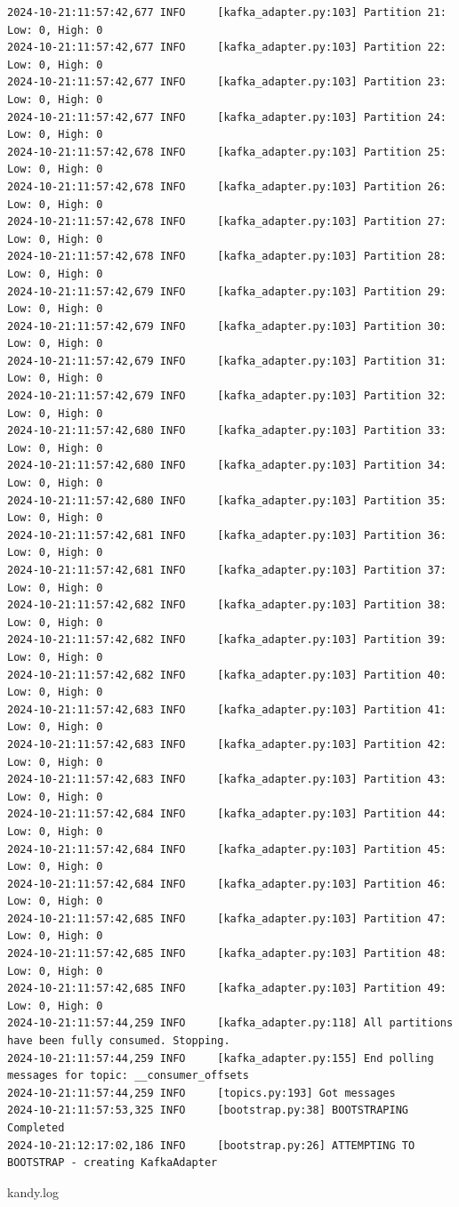 \documentclass[10pt , a4paper]{report}
\newenvironment{code}{\captionsetup{type=listing}}{}
\begin{document}
\begin{code}
\begin{verbatim}
2024-10-21:11:57:42,677 INFO     [kafka_adapter.py:103] Partition 21: Low: 0, High: 0
2024-10-21:11:57:42,677 INFO     [kafka_adapter.py:103] Partition 22: Low: 0, High: 0
2024-10-21:11:57:42,677 INFO     [kafka_adapter.py:103] Partition 23: Low: 0, High: 0
2024-10-21:11:57:42,677 INFO     [kafka_adapter.py:103] Partition 24: Low: 0, High: 0
2024-10-21:11:57:42,678 INFO     [kafka_adapter.py:103] Partition 25: Low: 0, High: 0
2024-10-21:11:57:42,678 INFO     [kafka_adapter.py:103] Partition 26: Low: 0, High: 0
2024-10-21:11:57:42,678 INFO     [kafka_adapter.py:103] Partition 27: Low: 0, High: 0
2024-10-21:11:57:42,678 INFO     [kafka_adapter.py:103] Partition 28: Low: 0, High: 0
2024-10-21:11:57:42,679 INFO     [kafka_adapter.py:103] Partition 29: Low: 0, High: 0
2024-10-21:11:57:42,679 INFO     [kafka_adapter.py:103] Partition 30: Low: 0, High: 0
2024-10-21:11:57:42,679 INFO     [kafka_adapter.py:103] Partition 31: Low: 0, High: 0
2024-10-21:11:57:42,679 INFO     [kafka_adapter.py:103] Partition 32: Low: 0, High: 0
2024-10-21:11:57:42,680 INFO     [kafka_adapter.py:103] Partition 33: Low: 0, High: 0
2024-10-21:11:57:42,680 INFO     [kafka_adapter.py:103] Partition 34: Low: 0, High: 0
2024-10-21:11:57:42,680 INFO     [kafka_adapter.py:103] Partition 35: Low: 0, High: 0
2024-10-21:11:57:42,681 INFO     [kafka_adapter.py:103] Partition 36: Low: 0, High: 0
2024-10-21:11:57:42,681 INFO     [kafka_adapter.py:103] Partition 37: Low: 0, High: 0
2024-10-21:11:57:42,682 INFO     [kafka_adapter.py:103] Partition 38: Low: 0, High: 0
2024-10-21:11:57:42,682 INFO     [kafka_adapter.py:103] Partition 39: Low: 0, High: 0
2024-10-21:11:57:42,682 INFO     [kafka_adapter.py:103] Partition 40: Low: 0, High: 0
2024-10-21:11:57:42,683 INFO     [kafka_adapter.py:103] Partition 41: Low: 0, High: 0
2024-10-21:11:57:42,683 INFO     [kafka_adapter.py:103] Partition 42: Low: 0, High: 0
2024-10-21:11:57:42,683 INFO     [kafka_adapter.py:103] Partition 43: Low: 0, High: 0
2024-10-21:11:57:42,684 INFO     [kafka_adapter.py:103] Partition 44: Low: 0, High: 0
2024-10-21:11:57:42,684 INFO     [kafka_adapter.py:103] Partition 45: Low: 0, High: 0
2024-10-21:11:57:42,684 INFO     [kafka_adapter.py:103] Partition 46: Low: 0, High: 0
2024-10-21:11:57:42,685 INFO     [kafka_adapter.py:103] Partition 47: Low: 0, High: 0
2024-10-21:11:57:42,685 INFO     [kafka_adapter.py:103] Partition 48: Low: 0, High: 0
2024-10-21:11:57:42,685 INFO     [kafka_adapter.py:103] Partition 49: Low: 0, High: 0
2024-10-21:11:57:44,259 INFO     [kafka_adapter.py:118] All partitions have been fully consumed. Stopping.
2024-10-21:11:57:44,259 INFO     [kafka_adapter.py:155] End polling messages for topic: __consumer_offsets
2024-10-21:11:57:44,259 INFO     [topics.py:193] Got messages
2024-10-21:11:57:53,325 INFO     [bootstrap.py:38] BOOTSTRAPING Completed
2024-10-21:12:17:02,186 INFO     [bootstrap.py:26] ATTEMPTING TO BOOTSTRAP - creating KafkaAdapter
  \end{verbatim}
  \caption{kandy.log}
\end{code}
\end{document}
